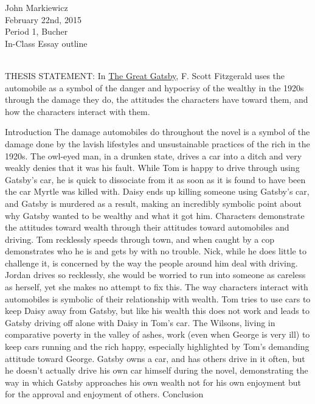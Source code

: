 \documentclass[11pt]{article}
\begin{document}
\begin{raggedleft}
John Markiewicz \\
February 22nd, 2015 \\
Period 1, Bucher \\
In-Class Essay outline \\
\end{raggedleft}
\noindent
\\ THESIS STATEMENT: In \underline{The Great Gatsby}, F. Scott Fitzgerald uses the automobile as a symbol of the danger and hypocrisy of the wealthy in the 1920s through the damage they do, the attitudes the characters have toward them, and how the characters interact with them.
\begin{outline}[enumerate]
	\1 Introduction
	\1 The damage automobiles do throughout the novel is a symbol of the damage done by the lavish lifestyles and unsustainable practices of the rich in the 1920s.
		\2 The owl-eyed man, in a drunken state, drives a car into a ditch and very weakly denies that it was his fault.
		\2 While Tom is happy to drive through using Gatsby's car, he is quick to dissociate from it as soon as it is found to have been the car Myrtle was killed with.
		\2 Daisy ends up killing someone using Gatsby's car, and Gatsby is murdered as a result, making an incredibly symbolic point about why Gatsby wanted to be wealthy and what it got him.
	\1 Characters demonstrate the attitudes toward wealth through their attitudes toward automobiles and driving.
		\2 Tom recklessly speeds through town, and when caught by a cop demonstrates who he is and gets by with no trouble.
		\2 Nick, while he does little to challenge it, is concerned by the way the people around him deal with driving.
		\2 Jordan drives so recklessly, she would be worried to run into someone as careless as herself, yet she makes no attempt to fix this.
	\1 The way characters interact with automobiles is symbolic of their relationship with wealth.
		\2 Tom tries to use cars to keep Daisy away from Gatsby, but like his wealth this does not work and leads to Gatsby driving off alone with Daisy in Tom's car.
		\2 The Wilsons, living in comparative poverty in the valley of ashes, work (even when George is very ill) to keep cars running and the rich happy, especially highlighted by Tom's demanding attitude toward George.
		\2 Gatsby owns a car, and has others drive in it often, but he doesn't actually drive his own car himself during the novel, demonstrating the way in which Gatsby approaches his own wealth not for his own enjoyment but for the approval and enjoyment of others.
	\1 Conclusion
\end{outline}
\end{document}
